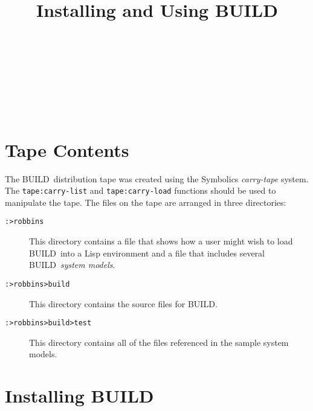 
\def\build{{\sf BUILD}}

\title{Installing and Using \build}
\author{\Rich\\
        \Digital\\
	\AITG\\
        \Street\\
	\City\\
        \Phone\\
        \Arpa}
\maketitle

\section{Tape Contents}

The \build\ distribution tape was created using the Symbolics {\em carry-tape}
system.  The {\tt tape:carry-list} and {\tt tape:carry-load} functions should
be used to manipulate the tape.  The files on the tape are arranged in three
directories:
\begin{description}
\item[{\tt :>robbins}]
This directory contains a file that shows how
a user might wish to load \build\ into a Lisp environment and a file
that includes several \build\ {\em system models}.

\item[{\tt :>robbins>build}] This directory contains the source files for
\build.

\item[{\tt :>robbins>build>test}]
This directory contains all of the files referenced in the sample
system models.
\end{description}

\section{Installing \build}


